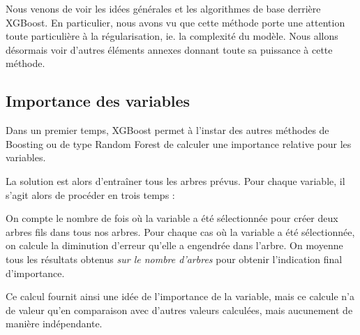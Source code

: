 Nous venons de voir les idées générales et les algorithmes de base derrière XGBoost. En particulier, nous avons vu que cette méthode porte une attention toute particulière à la régularisation, ie. la complexité du modèle. Nous allons désormais voir d'autres éléments annexes donnant toute sa puissance à cette méthode.

\subsection{Importance des variables}
Dans un premier temps, XGBoost permet à l'instar des autres méthodes de Boosting ou de type Random Forest de calculer une importance relative pour les variables.

La solution est alors d'entraîner tous les arbres prévus. Pour chaque variable, il s'agit alors de procéder en trois temps :
\begin{itemize}
	On compte le nombre de fois où la variable a été sélectionnée pour créer deux arbres fils dans tous nos arbres.
	Pour chaque cas où la variable a été sélectionnée, on calcule la diminution d'erreur qu'elle a engendrée dans l'arbre.
	On moyenne tous les résultats obtenus \textit{sur le nombre d'arbres} pour obtenir l'indication final d'importance.
\end{itemize}

Ce calcul fournit ainsi une idée de l'importance de la variable, mais ce calcule n'a de valeur qu'en comparaison avec d'autres valeurs calculées, mais aucunement de manière indépendante.